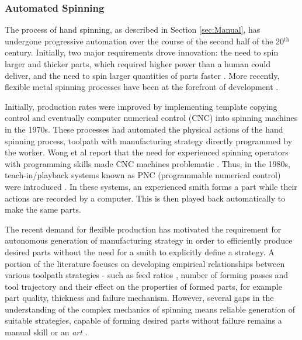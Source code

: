 \subsubsection{Automated Spinning} \label{sec:MechSpinning}

The process of hand spinning, as described in Section \ref{sec:Manual}, has undergone progressive automation over the course of the second half of the 20$^{\text{th}}$ century. Initially, two major requirements drove innovation: the need to spin larger and thicker parts, which required higher power than a human could deliver, and the need to spin larger quantities of parts faster \citep{Wong2003AProcesses}. More recently, flexible metal spinning processes have been at the forefront of development \citep{TheUseLessGroupFlexibleSpinning}.


Initially, production rates were improved by implementing template copying control and eventually computer numerical control (CNC) into spinning machines in the 1970s. These processes had automated the physical actions of the hand spinning process, toolpath with manufacturing strategy directly programmed by the worker. Wong et al report that the need for experienced spinning operators with programming skills made CNC machines problematic \citep{Wong2003AProcesses}. Thus, in the 1980s, teach-in/playback systems known as PNC (programmable numerical control) were introduced \citep{Lloyd1986AnProspective}. In these systems, an experienced smith forms a part while their actions are recorded by a computer. This is then played back automatically to make the same parts. %

The recent demand for flexible production has motivated the requirement for autonomous generation of manufacturing strategy in order to efficiently produce desired parts without the need for a smith to explicitly define a strategy. A portion of the literature focuses on developing empirical relationships between various toolpath strategies - such as feed ratios \citep{El-Khabeery1991OnCups,Sugar2016AnalysisSteels,Wang2011EffectsCup}, number of forming passes \citep{HAYAMA1970StudySpinning} and tool trajectory \citep{Gan2016AComponents,Wang2011ASpinning,Polyblank2015ParametricSpinning} and their effect on the properties of formed parts, for example part quality, thickness and failure mechanism. 
However, several gaps in the understanding of the complex mechanics of spinning means reliable generation of suitable strategies, capable of forming desired parts without failure remains a manual skill or an \textit{art} \citep{Music2010ASpinning}.

